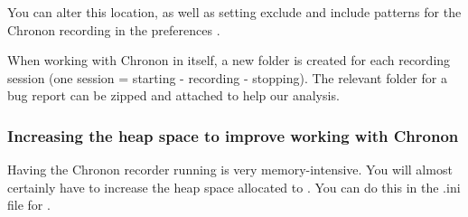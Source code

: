 You can alter this location, as well as setting exclude and include patterns for the Chronon recording in the preferences . 

When working with Chronon in \app{} itself, a new folder is created for each recording session (one session = starting - recording - stopping). The relevant folder for a bug report can be zipped and attached to help our analysis. 


\subsubsection{Increasing the heap space to improve working with Chronon}
Having the Chronon recorder running is very memory-intensive. You will almost certainly have to increase the heap space allocated to \app{}. You can do this in the .ini file for \app{}. 




